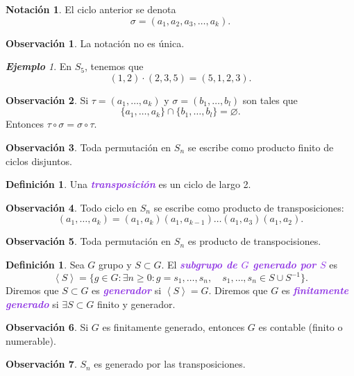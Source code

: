 \documentclass{article}
\theoremstyle{definition}
\newtheorem{definition}[theorem]{Definición}
\newtheorem*{notation}{Notación}
\newtheorem*{obs}{Observación}
\theoremstyle{remark}
\newtheorem{example}[theorem]{\textbf{Ejemplo}}
\numberwithin{equation}{section}
\renewcommand{\c}{\cdot}
\newcommand{\gen}[1]{\left\langle #1 \right\rangle}
\newcommand{\wea}[1]{\textcolor{BlueViolet}{\textbf{\emph{#1}}}}
\begin{document}
\begin{notation}
  El ciclo anterior se denota
  \[\sigma = (a_1,a_2,a_3,\dots,a_k).\]
\end{notation}

\begin{obs}
  La notación no es única.
\end{obs}

\begin{example}
  En $S_5$, tenemos que
  \[(1,2)\c(2,3,5) = (5,1,2,3).\]
\end{example}

\begin{obs}
  Si $\tau = (a_1,\dots,a_k)$ y $\sigma = (b_1,\dots,b_l)$ son tales que
  \[\{a_1,\dots,a_k\} \cap \{b_1,\dots,b_l\} = \varnothing.\]
  Entonces $\tau \circ \sigma = \sigma \circ \tau$.
\end{obs}

\begin{obs}
  Toda permutación en $S_n$ se escribe como producto finito de ciclos disjuntos.
\end{obs}

\begin{definition}
  Una \wea{transposición} es un ciclo de largo 2.
\end{definition}

\begin{obs}
  Todo ciclo en $S_n$ se escribe como producto de transposiciones:
  \[(a_1,\dots,a_k) = (a_1,a_k)(a_1,a_{k-1}) \dots (a_1,a_3)(a_1,a_2).\]
\end{obs}

\begin{obs}
  Toda permutación en $S_n$ es producto de transpocisiones.
\end{obs}

\begin{definition}
  Sea $G$ grupo y $S \subset G$. El \wea{subgrupo de $G$ generado por $S$} es
  \[\gen{S} = \{g \in G \colon \exists n \geq 0 \colon g = s_1,\dots,s_n, \quad s_1,\dots,s_n \in S \cup S^{-1}\}.\]
  Diremos que $S \subset G$ es \wea{generador} si $\gen{S} = G$.
  Diremos que $G$ es \wea{finitamente generado} si $\exists S \subset G$ finito y generador.
\end{definition}

\begin{obs}
  Si $G$ es finitamente generado, entonces $G$ es contable (finito o numerable).
\end{obs}

\begin{obs}
  $S_n$ es generado por las transposiciones.
\end{obs}
\end{document}
